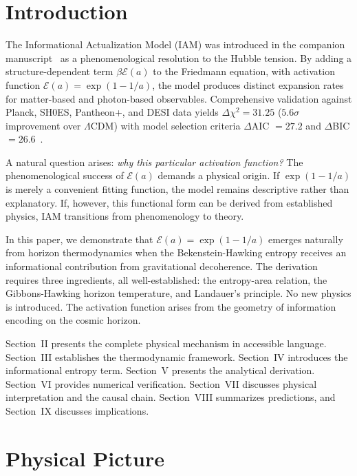 \documentclass[twocolumn,superscriptaddress,prl,amsmath,amssymb]{revtex4-2}
\begin{document}
\section{Introduction}

The Informational Actualization Model (IAM) was introduced in the companion manuscript~\cite{Mahaffey2026main} as a phenomenological resolution to the Hubble tension. By adding a structure-dependent term $\beta\mathcal{E}(a)$ to the Friedmann equation, with activation function $\mathcal{E}(a) = \exp(1 - 1/a)$, the model produces distinct expansion rates for matter-based and photon-based observables. Comprehensive validation against Planck, SH0ES, Pantheon+, and DESI data yields $\Delta\chi^2 = 31.25$ ($5.6\sigma$ improvement over $\Lambda$CDM) with model selection criteria $\Delta$AIC $= 27.2$ and $\Delta$BIC $= 26.6$~\cite{Mahaffey2026compendium}.

A natural question arises: \textit{why this particular activation function?} The phenomenological success of $\mathcal{E}(a)$ demands a physical origin. If $\exp(1 - 1/a)$ is merely a convenient fitting function, the model remains descriptive rather than explanatory. If, however, this functional form can be derived from established physics, IAM transitions from phenomenology to theory.

In this paper, we demonstrate that $\mathcal{E}(a) = \exp(1-1/a)$ emerges naturally from horizon thermodynamics when the Bekenstein-Hawking entropy receives an informational contribution from gravitational decoherence. The derivation requires three ingredients, all well-established: the entropy-area relation, the Gibbons-Hawking horizon temperature, and Landauer's principle. No new physics is introduced. The activation function arises from the geometry of information encoding on the cosmic horizon.

Section~II presents the complete physical mechanism in accessible language. Section~III establishes the thermodynamic framework. Section~IV introduces the informational entropy term. Section~V presents the analytical derivation. Section~VI provides numerical verification. Section~VII discusses physical interpretation and the causal chain. Section~VIII summarizes predictions, and Section~IX discusses implications.

\section{Physical Picture}
\label{sec:physical}
\end{document}
